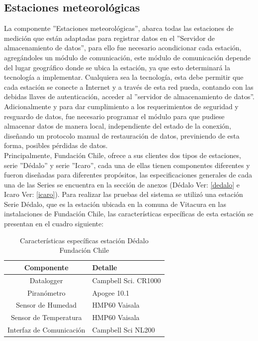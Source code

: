 \newpage
\subsection{Estaciones meteorológicas}
La componente ''Estaciones meteorológicas'', abarca todas las estaciones de medición que están adaptadas para registrar datos en el ''Servidor de almacenamiento de datos'', para ello fue necesario acondicionar cada estación, agregándoles un módulo de comunicación, este módulo de comunicación depende del lugar geográfico donde se ubica la estación, ya que esto determinará la tecnología a implementar. Cualquiera sea la tecnología, esta debe permitir que cada estación se conecte a Internet y a través de esta red pueda, contando con las debidas llaves de autenticación, acceder al ''servidor de almacenamiento de datos''. Adicionalmente y para dar cumplimiento a los requerimientos de seguridad y resguardo de datos, fue necesario programar el módulo para que pudiese almacenar datos de manera local, independiente del estado de la conexión, diseñando un protocolo manual de restauración de datos, previniendo de esta forma, posibles pérdidas de datos.\\

Principalmente, Fundación Chile, ofrece a sus clientes dos tipos de estaciones, serie ''Dédalo'' y serie ''Icaro'', cada una de ellas tienen componentes diferentes y fueron diseñadas para diferentes propósitos, las especificaciones generales de cada una de las Series se encuentra en la sección de anexos (Dédalo Ver: \ref{dedalo} e Icaro Ver: \ref{icaro}). Para realizar las pruebas del sistema se utilizó una estación Serie Dédalo, que es la estación ubicada en la comuna de Vitacura en las instalaciones de Fundación Chile, las características específicas de esta estación se presentan en el cuadro siguiente:

\begin{table}[h!]
\label{estacionDedalo}
\caption{Características específicas estación Dédalo Fundación Chile}
\begin{tabular}{| c | p{9cm} |}
        \hline
        \textbf{Componente}  &       \textbf{Detalle}        \\
        \hline
	Datalogger&Campbell Sci. CR1000\\
	\hline
	Piranómetro&Apogee 10.1\\
	\hline
	Sensor de Humedad&HMP60 Vaisala\\
	\hline
	Sensor de Temperatura&HMP60 Vaisala\\
	\hline
	Interfaz de Comunicación&Campbell Sci NL200\\
	\hline
\end{tabular}
\end{table}

